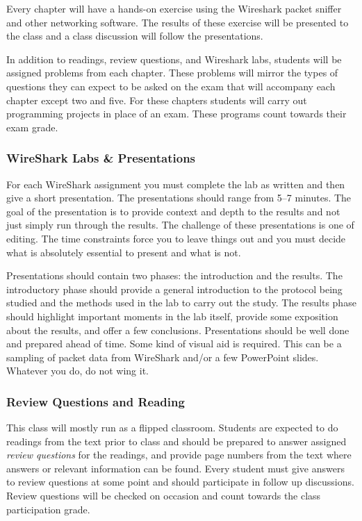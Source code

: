 \documentclass[10pt]{article}
\begin{document}
Every chapter will have a hands-on exercise using the Wireshark packet sniffer and other networking software. The results of these exercise will be presented to the class and a class discussion will follow the presentations.

In addition to readings, review questions, and Wireshark labs, students will be assigned problems from each chapter. These problems will mirror the types of questions they can expect to be asked on the exam that will accompany each chapter except two and five. For these chapters students will carry out programming projects in place of an exam. These programs count towards their exam grade.

\subsubsection{WireShark Labs \& Presentations}

For each WireShark assignment you must complete the lab as written and then give a short presentation. The presentations should range from 5--7 minutes. The goal of the presentation is to provide context and depth to the results and not just simply run through the results. The challenge of these presentations is one of editing. The time constraints force you to leave things out and you must decide what is absolutely essential to present and what is not.

Presentations should contain two phases: the introduction and the results.  The introductory phase should provide a general introduction to the protocol being studied and the methods used in the lab to carry out the study. The results phase should highlight important moments in the lab itself, provide some exposition about the results, and offer a few conclusions. Presentations should be well done and prepared ahead of time. Some kind of visual aid is required. This can be a sampling of packet data from WireShark and/or a few PowerPoint slides. Whatever you do, do not wing it.

\subsubsection{Review Questions and Reading}

This class will mostly run as a flipped classroom. Students are expected to do readings from the text prior to class and should be prepared to answer assigned \textit{review questions} for the readings, and provide page numbers from the text where answers or relevant information can be found. Every student must give answers to review questions at some point and should participate in follow up discussions. Review questions will be checked on occasion and count towards the class participation grade.
\end{document}
